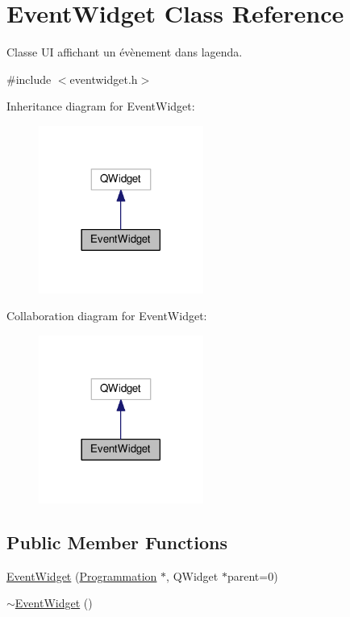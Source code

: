 \hypertarget{class_event_widget}{}\section{Event\+Widget Class Reference}
\label{class_event_widget}


Classe U\+I affichant un évènement dans l\textquotesingle{}agenda.  




{\ttfamily \#include $<$eventwidget.\+h$>$}



Inheritance diagram for Event\+Widget\+:\nopagebreak
\begin{figure}[H]
\begin{center}
\leavevmode
\includegraphics[width=153pt]{class_event_widget__inherit__graph}
\end{center}
\end{figure}


Collaboration diagram for Event\+Widget\+:\nopagebreak
\begin{figure}[H]
\begin{center}
\leavevmode
\includegraphics[width=153pt]{class_event_widget__coll__graph}
\end{center}
\end{figure}
\subsection*{Public Member Functions}
\begin{DoxyCompactItemize}
\item 
\hyperlink{class_event_widget_a3db7da18ff8c1b844ecace1a059923c9}{Event\+Widget} (\hyperlink{class_programmation}{Programmation} $\ast$, Q\+Widget $\ast$parent=0)
\item 
\hyperlink{class_event_widget_a88d69e21ca3519d14d22cea87eb81b67}{$\sim$\+Event\+Widget} ()
\end{DoxyCompactItemize}


